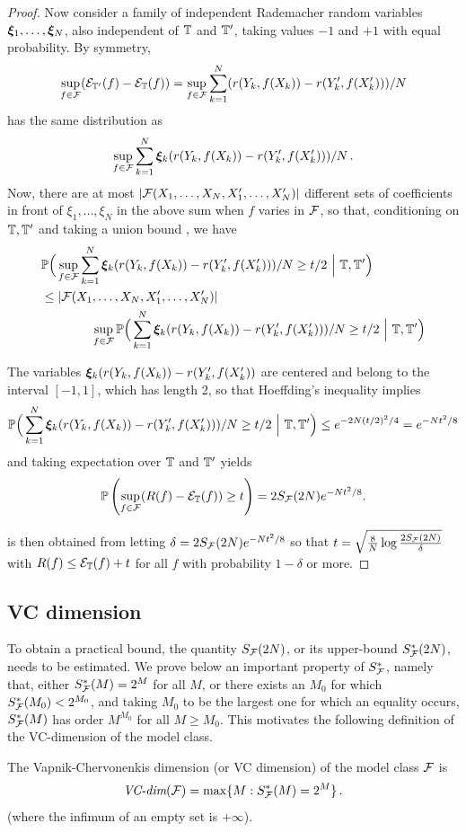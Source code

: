 \begin{proof}
Now consider a family of independent Rademacher random variables ${\bm{\xi}}_1, \ldots, {\bm{\xi}}_N$, also independent of ${\mathbb T}$ and ${\mathbb T}'$, taking values $-1$ and $+1$ with equal probability. By symmetry, 
\[
\sup_{f\in{\mathcal F}}  ({\mathcal E}_{{\mathbb T}'}(f) - {\mathcal E}_{{\mathbb T}}(f)) = \sup_{f\in{\mathcal F}}  \sum_{k=1}^N (r(Y_k, f(X_k)) - r(Y'_k, f(X'_k)))/N
\]
has the same distribution as 
\[
\sup_{f\in{\mathcal F}}  \sum_{k=1}^N {\bm{\xi}}_k (r(Y_k, f(X_k)) - r(Y'_k, f(X'_k)))/N\,.
\]
Now, there are at most $|{\mathcal F}(X_1, \ldots, X_N, X'_1, \ldots, X'_N)|$ different sets of coefficients in front of $\xi_1, \ldots, \xi_N$ in the above sum when $f$ varies in ${\mathcal F}$, so that, conditioning on ${\mathbb T}, {\mathbb T}'$ and taking a union bound , we have
\begin{align*}
&\bm{\mathbb P}\Big(\sup_{f\in{\mathcal F}}  \sum_{k=1}^N {\bm{\xi}}_k (r(Y_k, f(X_k)) - r(Y'_k, f(X'_k)))/N \geq t/2\ \Big|\ {\mathbb T}, {\mathbb T}'\Big)\\
& \leq 
 |{\mathcal F}(X_1, \ldots, X_N, X'_1, \ldots, X'_N)|  \\
 & \qquad\qquad \sup_{f\in{\mathcal F}}\bm{\mathbb P}\Big(\sum_{k=1}^N {\bm{\xi}}_k (r(Y_k, f(X_k)) - r(Y'_k, f(X'_k)))/N \geq t/2\ \Big|\ {\mathbb T}, {\mathbb T}'\Big)
\end{align*}

The variables ${\bm{\xi}}_k(r(Y_k, f(X_k)) - r(Y'_k, f(X'_k))$ are centered and belong to the interval $[-1,1]$, which has length 2, so that
 Hoeffding's inequality implies
\[
\bm{\mathbb P}\Big(\sum_{k=1}^N {\bm{\xi}}_k (r(Y_k, f(X_k)) - r(Y'_k, f(X'_k)))/N \geq t/2\ \Big|\  {\mathbb T}, {\mathbb T}'\Big) \leq e^{-2N(t/2)^2/4} = e^{-Nt^2/8}
\]
and taking expectation over ${\mathbb T}$ and ${\mathbb T}'$ yields
\[
\bm{\mathbb P}\left(\sup_{f\in{\mathcal F}} (R(f) - {\mathcal E}_{\mathbb T}(f)) \geq t\right) = 2 S_{\mathcal F}(2N)e^{-Nt^2/8}.
\]

 is then obtained from letting $\delta = 2 S_{\mathcal F}(2N)e^{-Nt^2/8}$ so that 
$t = \sqrt{\frac8N \log \frac{2 S_{\mathcal F}(2N)}{\delta}}$ with $R(f) \leq {\mathcal E}_{{\mathbb T}}(f) + t$ for all $f$ with probability $1-\delta$ or more.
\end{proof}
 
\subsection{VC dimension}

To obtain a practical bound, the quantity $S_{\mathcal F}(2N)$, or its upper-bound $S_{\mathcal F}^*(2N)$, needs to be estimated.
We prove below an important property
of $S_{\mathcal F}^*$, namely that, either $S_{\mathcal F}^*(M) = 2^M$ for all $M$, or there
exists an $M_0$ for which $S_{\mathcal F}^*(M_0) < 2^{M_0}$, and taking $M_0$ to be
the largest one for which an equality occurs, $S_{\mathcal F}^*(M)$ has order $M^{M_0}$ for all $M\geq
M_0$. This motivates the following definition of the VC-dimension of the model class.
\begin{definition}
\label{def:vc.dim}
The Vapnik-Chervonenkis dimension (or VC dimension) of  the model class ${\mathcal F}$ is 
\[
\textit{VC-dim}({\mathcal F})  = \max\{M: S^*_{{\mathcal F}}(M) = 2^M\}\,.
\]
(where the infimum of an empty set is $+\infty$).
\end{definition}

